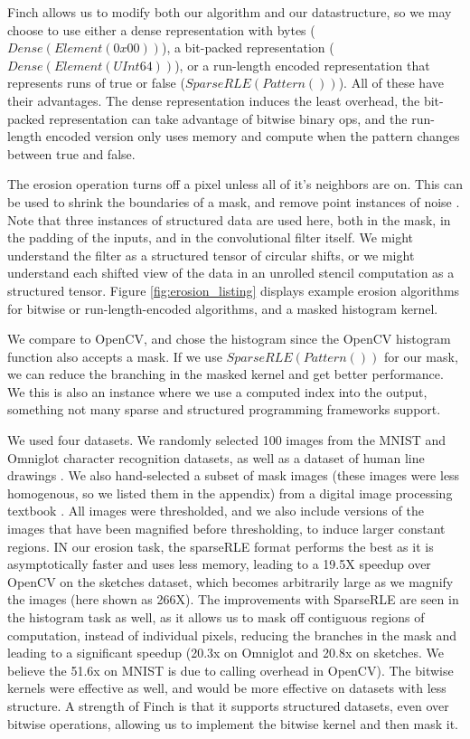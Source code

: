 Finch allows us to modify both our algorithm and our datastructure, so we may choose to use either a dense representation with bytes ($Dense(Element(0x00))$), a bit-packed representation ($Dense(Element(UInt64))$), or a run-length encoded representation that represents runs of true or false ($SparseRLE(Pattern())$).
%
All of these have their advantages.
%
The dense representation induces the least overhead, the bit-packed representation can take advantage of bitwise binary ops, and the run-length encoded version only uses memory and compute when the pattern changes between true and false.

The erosion operation turns off a pixel unless all of it's neighbors are on.
%
This can be used to shrink the boundaries of a mask, and remove point instances of noise \cite{fisher_hypermedia_1996}.
%
Note that three instances of structured data are used here, both in the mask, in the padding of the inputs, and in the convolutional filter itself.
%
We might understand the filter as a structured tensor of circular shifts, or we might understand each shifted view of the data in an unrolled stencil computation as a structured tensor.
Figure \ref{fig:erosion_listing} displays example erosion algorithms for bitwise
or run-length-encoded algorithms, and a masked histogram kernel.

We compare to OpenCV, and chose the histogram since the OpenCV histogram function also accepts a mask. If we use $SparseRLE(Pattern())$ for our mask, we can reduce the branching
in the masked kernel and get better performance.
%
We this is also an instance where we use a computed index into the output, something not many sparse and structured programming frameworks support.

We used four datasets. We randomly selected 100 images from the MNIST \cite{lecun_gradient-based_1998} and Omniglot \cite{lake_human-level_2015} character recognition datasets, as well as a dataset of human line drawings \cite{eitz_how_2012}. We also hand-selected a subset of mask images (these images were less homogenous, so we listed them in the appendix) from a digital image processing textbook \cite{gonzalez_digital_2006}. All images were thresholded, and we also include versions of the images that have been magnified before thresholding, to induce larger constant regions. IN our erosion task, the sparseRLE format performs the best as it is asymptotically faster and uses less memory, leading to a 19.5X speedup over OpenCV on the sketches dataset, which becomes arbitrarily large as we magnify the images (here shown as 266X). The improvements with SparseRLE are seen in the histogram task as well, as it allows us to
mask off contiguous regions of computation, instead of individual pixels, reducing the branches in the mask and leading to a significant speedup (20.3x on Omniglot and 20.8x on sketches. We believe the 51.6x on MNIST is due to calling overhead in OpenCV). The bitwise kernels were effective as well, and would be more effective on datasets with less structure. A strength of Finch is that it supports structured datasets, even over bitwise operations, allowing us to implement the bitwise kernel and then mask it.


